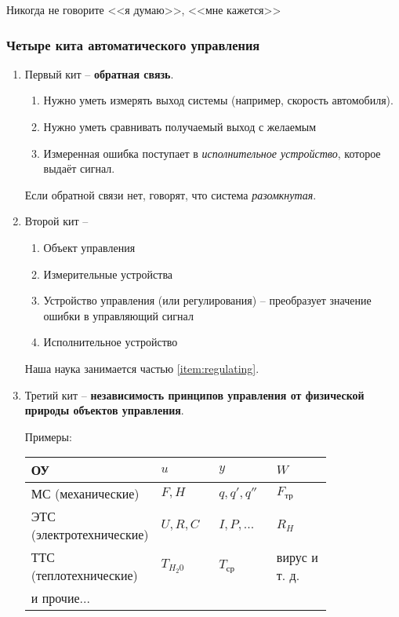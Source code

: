 \documentclass[main.tex]{subfiles}
\begin{document}
	Никогда не говорите <<я думаю>>, <<мне кажется>>

\subsubsection{Четыре кита автоматического управления}

\begin{enumerate}
	\item Первый кит -- \textbf{обратная связь}.
	\begin{enumerate}[noitemsep]
		\item Нужно уметь измерять выход системы (например, скорость автомобиля).
		\item Нужно уметь сравнивать получаемый выход с желаемым
		\item Измеренная ошибка поступает в \emph{исполнительное устройство}, которое выдаёт сигнал.
	\end{enumerate}
	Если обратной связи нет, говорят, что система \emph{разомкнутая}.
	\item Второй кит -- %
	\begin{enumerate}[noitemsep]
		\item Объект управления
		\item Измерительные устройства
		\item Устройство управления (или регулирования) -- преобразует значение ошибки в управляющий сигнал \label{item:regulating}
		\item  Исполнительное устройство
	\end{enumerate}

	Наша наука занимается частью \ref{item:regulating}.
	\item Третий кит -- \textbf{независимость принципов управления от физической природы объектов управления}.

	Примеры:

	\begin{tabular}{m{0.2\linewidth} | m{0.2\linewidth} | m{0.2\linewidth} | m{0.2\linewidth}}
		\hline \hline
		ОУ & $ u $ & $ y $ & $ W $ \\
		\hline
		МС (механические) & $ F, H $ & $ q, q', q'' $ & $ F_{\text{тр}} $ \\
		ЭТС (электротехнические) & $ U, R, C $ & $ I, P, ... $ & $ R_H $ \\
		ТТС (теплотехнические) & $ T_{H_2 0} $ & $ T_{\text{ср}} $ & вирус и т. д. \\
		и прочие... & & & \\
		\hline
	\end{tabular}


\end{enumerate}
\end{document}
